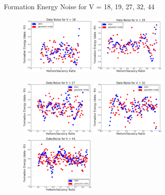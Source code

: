 \documentclass[10pt]{beamer}
\begin{document}
\begin{frame}{Formation Energy Noise for V = 18, 19, 27, 32, 44}
     \vspace{-2mm}
     \begin{figure}[!htp]
         \includegraphics[width=0.33\textwidth]{V18noise}
         \hspace{4mm}
         \includegraphics[width=0.33\textwidth]{V19noise}
     \end{figure}
     \vspace{-3mm}
     \begin{figure}[!htp]
         \includegraphics[width=0.33\textwidth]{V27noise}
         \includegraphics[width=0.33\textwidth]{V32noise}
         \includegraphics[width=0.33\textwidth]{V44noise}
     \end{figure}
\end{frame}
\end{document}

